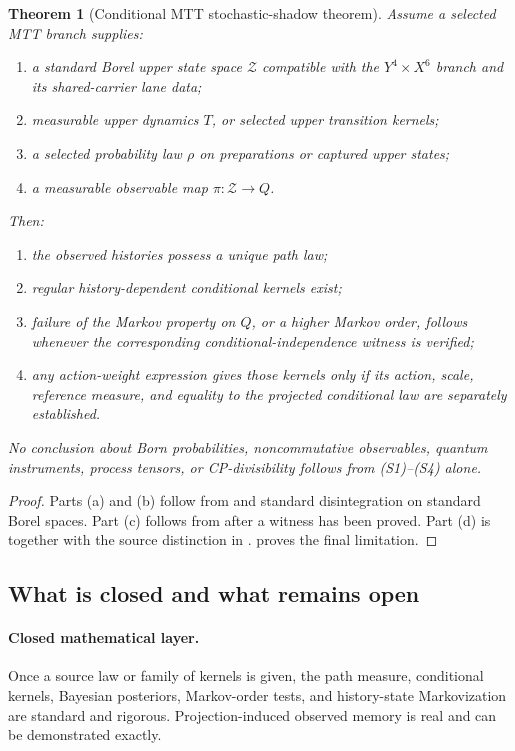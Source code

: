 \documentclass[11pt]{article}
\newtheorem{theorem}{Theorem}[section]
\theoremstyle{definition}
\theoremstyle{remark}
\newcommand{\cZ}{\mathcal{Z}}
\begin{document}
\begin{theorem}[Conditional MTT stochastic-shadow theorem]\label{thm:mtt}
Assume a selected MTT branch supplies:
\begin{enumerate}[label=(S\arabic*)]
\item a standard Borel upper state space \(\cZ\) compatible with the
  \(Y^4\times X^6\) branch and its shared-carrier lane data;
\item measurable upper dynamics \(T\), or selected upper transition kernels;
\item a selected probability law \(\rho\) on preparations or captured upper
  states;
\item a measurable observable map \(\pi:\cZ\to Q\).
\end{enumerate}
Then:
\begin{enumerate}[label=(\alph*)]
\item the observed histories possess a unique path law;
\item regular history-dependent conditional kernels exist;
\item failure of the Markov property on \(Q\), or a higher Markov order,
  follows whenever the corresponding conditional-independence witness is
  verified;
\item any action-weight expression gives those kernels only if its action,
  scale, reference measure, and equality to the projected conditional law are
  separately established.
\end{enumerate}
No conclusion about Born probabilities, noncommutative observables, quantum
instruments, process tensors, or CP-divisibility follows from (S1)--(S4)
alone.
\end{theorem}

\begin{proof}
Parts (a) and (b) follow from  and standard
disintegration on standard Borel spaces.  Part (c) follows from
 after a witness has been proved.
Part (d) is  together with the source distinction in
.   proves the final limitation.
\end{proof}

\subsection{What is closed and what remains open}

\paragraph{Closed mathematical layer.}
Once a source law or family of kernels is given, the path measure, conditional
kernels, Bayesian posteriors, Markov-order tests, and history-state
Markovization are standard and rigorous.  Projection-induced observed memory
is real and can be demonstrated exactly.
\end{document}
